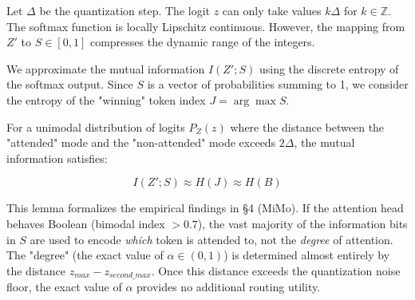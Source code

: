 Let $\Delta$ be the quantization step. The logit $z$ can only take values $k\Delta$ for $k \in \mathbb{Z}$. The softmax function is locally Lipschitz continuous. However, the mapping from $Z'$ to $S \in [0, 1]$ compresses the dynamic range of the integers.













We approximate the mutual information $I(Z'; S)$ using the discrete entropy of the softmax output. Since $S$ is a vector of probabilities summing to 1, we consider the entropy of the "winning" token index $J = \arg \max S$.













\begin{lemma}






\label{lem:binary_dominance}






For a unimodal distribution of logits $P_Z(z)$ where the distance between the "attended" mode and the "non-attended" mode exceeds $2\Delta$, the mutual information satisfies:






$$ I(Z'; S) \approx H(J) \approx H(B) $$






\end{lemma}













This lemma formalizes the empirical findings in §4 (MiMo). If the attention head behaves Boolean (bimodal index $> 0.7$), the vast majority of the information bits in $S$ are used to encode \textit{which} token is attended to, not the \textit{degree} of attention. The "degree" (the exact value of $\alpha \in (0, 1)$) is determined almost entirely by the distance $z_{max} - z_{second\_max}$. Once this distance exceeds the quantization noise floor, the exact value of $\alpha$ provides no additional routing utility.













